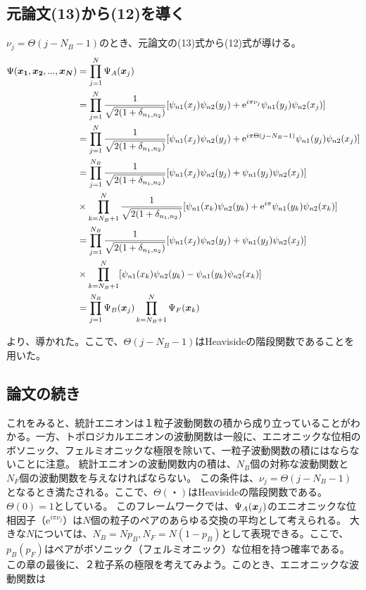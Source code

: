 \documentclass[a4paper,11pt]{jsarticle}
\numberwithin{equation}{section}
\begin{document}
\subsection{元論文(13)から(12)を導く}
$\nu_j=\Theta(j-N_B-1)$のとき、元論文の(13)式から(12)式が導ける。
\begin{align}
  \Psi(\vb*{x_1},\vb*{x_2},...,\vb*{x_N})&=\prod_{j=1}^{N}\Psi_A(\vb*{x}_j)\\
  &=\prod_{j=1}^{N}\frac{1}{\sqrt{2(1+\delta_{n_1,n_2})}}[\psi_{n1}(x_j)\psi_{n2}(y_j)+\mathrm{e}^{i\pi\nu_j}\psi_{n1}(y_j)\psi_{n2}(x_j)]\\
  &=\prod_{j=1}^{N}\frac{1}{\sqrt{2(1+\delta_{n_1,n_2})}}[\psi_{n1}(x_j)\psi_{n2}(y_j)+\mathrm{e}^{i\pi\Theta(j-N_B-1)}\psi_{n1}(y_j)\psi_{n2}(x_j)]\\
  &=\prod_{j=1}^{N_B}\frac{1}{\sqrt{2(1+\delta_{n_1,n_2})}}[\psi_{n1}(x_j)\psi_{n2}(y_j)+\psi_{n1}(y_j)\psi_{n2}(x_j)]\notag\\
  &\times\prod_{k=N_B+1}^{N}\frac{1}{\sqrt{2(1+\delta_{n_1,n_2})}}[\psi_{n1}(x_k)\psi_{n2}(y_k)+\mathrm{e}^{i\pi}\psi_{n1}(y_k)\psi_{n2}(x_k)]\\
  &=\prod_{j=1}^{N_B}\frac{1}{\sqrt{2(1+\delta_{n_1,n_2})}}[\psi_{n1}(x_j)\psi_{n2}(y_j)+\psi_{n1}(y_j)\psi_{n2}(x_j)]\notag\\
  &\times\prod_{k=N_B+1}^{N}[\psi_{n1}(x_k)\psi_{n2}(y_k)-\psi_{n1}(y_k)\psi_{n2}(x_k)]\\
  &=\prod_{j=1}^{N_B}\Psi_B(\vb*{x}_j)\prod_{k=N_B+1}^{N}\Psi_F(\vb*{x}_k) 
\end{align}

より、導かれた。ここで、$\Theta(j-N_B-1)$はHeavisideの階段関数であることを用いた。

\subsection{論文の続き}
これをみると、統計エニオンは１粒子波動関数の積から成り立っていることがわかる。一方、トポロジカルエニオンの波動関数は一般に、エニオニックな位相のボソニック、フェルミオニックな極限を除いて、一粒子波動関数の積にはならないことに注意。
統計エニオンの波動関数内の積は、$N_B$個の対称な波動関数と$N_F$個の波動関数を与えなければならない。
この条件は、$\nu_j=\Theta(j-N_B-1)$となるとき満たされる。ここで、$\Theta(・)$はHeavisideの階段関数である。$\Theta(0)=1$としている。
このフレームワークでは、$\Psi_A(\vb*{x}_j)$のエニオニックな位相因子（$\mathrm{e}^{i\pi\nu_j}$）は$N$個の粒子のペアのあらゆる交換の平均として考えられる。
大きな$N$については、$N_B=Np_B,N_F=N(1-p_B)$として表現できる。ここで、$p_B(p_F)$はペアがボソニック（フェルミオニック）な位相を持つ確率である。
この章の最後に、２粒子系の極限を考えてみよう。このとき、エニオニックな波動関数は
\end{document}
